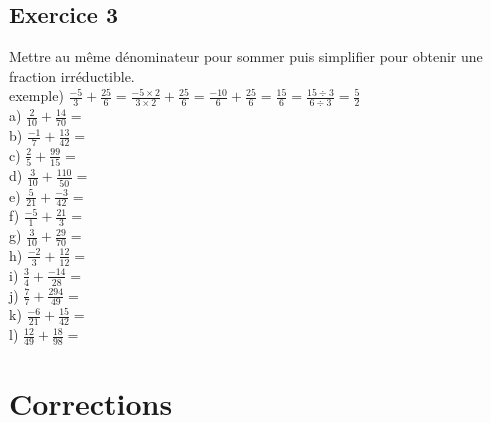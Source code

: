 \documentclass{article}
\begin{document}
\subsection*{Exercice 3}
Mettre au même dénominateur pour sommer puis simplifier pour obtenir une fraction irréductible.\\
exemple) $\frac{-5}{3}+\frac{25}{6}=\frac{-5\times2}{3\times2}+\frac{25}{6}=\frac{-10}{6}+\frac{25}{6}=\frac{15}{6}=\frac{15\div3}{6\div3}=\frac{5}{2}$\\ 
\vspace{10 mm}
a) $\frac{2}{10}+\frac{14}{70}=$\\ 
\vspace{10 mm}
b) $\frac{-1}{7}+\frac{13}{42}=$\\ 
\vspace{10 mm}
c) $\frac{2}{5}+\frac{99}{15}=$\\ 
\vspace{10 mm}
d) $\frac{3}{10}+\frac{110}{50}=$\\ 
\vspace{10 mm}
e) $\frac{5}{21}+\frac{-3}{42}=$\\ 
\vspace{10 mm}
f) $\frac{-5}{1}+\frac{21}{3}=$\\ 
\vspace{10 mm}
g) $\frac{3}{10}+\frac{29}{70}=$\\ 
\vspace{10 mm}
h) $\frac{-2}{3}+\frac{12}{12}=$\\ 
\vspace{10 mm}
i) $\frac{3}{4}+\frac{-14}{28}=$\\ 
\vspace{10 mm}
j) $\frac{7}{7}+\frac{294}{49}=$\\ 
\vspace{10 mm}
k) $\frac{-6}{21}+\frac{15}{42}=$\\ 
\vspace{10 mm}
l) $\frac{12}{49}+\frac{18}{98}=$\\ 
\vspace{10 mm}
\newpage
\section*{Corrections}
\end{document}
